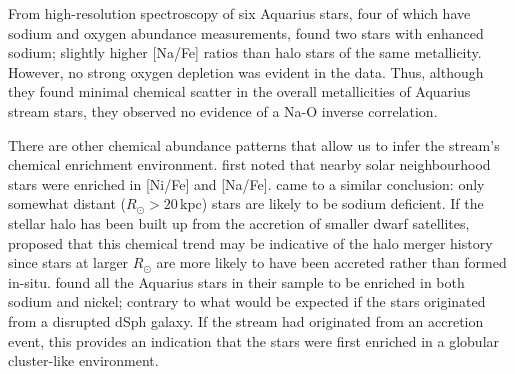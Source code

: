 \documentclass{emulateapj}
\begin{document}

From high-resolution spectroscopy of six Aquarius stars, four of which have sodium and oxygen abundance measurements, \citet{wylie-de-boer;et-al_2012} found two stars with enhanced sodium; slightly higher [Na/Fe] ratios than halo stars of the same metallicity. However, no strong oxygen depletion was evident in the data. Thus, although they found minimal chemical scatter in the overall metallicities of Aquarius stream stars, they observed no evidence of a {Na-O} inverse correlation.

There are other chemical abundance patterns that allow us to infer the stream's chemical enrichment environment. \citet{nissen;schuster_1997} first noted that nearby solar neighbourhood stars were enriched in [Ni/Fe] and [Na/Fe]. \citet{fulbright_2000} came to a similar conclusion: only somewhat distant ($R_\odot > 20$\,kpc) stars are likely to be sodium deficient. If the stellar halo has been built up from the accretion of smaller dwarf satellites, \citet{nissen;schuster_1997} proposed that this chemical trend may be indicative of the halo merger history since stars at larger $R_\odot$ are more likely to have been accreted rather than formed in-situ. \citet{wylie-de-boer;et-al_2012} found all the Aquarius stars in their sample to be enriched in both sodium and nickel; contrary to what would be expected if the stars originated from a disrupted dSph galaxy. If the stream had originated from an accretion event, this provides an indication that the stars were first enriched in a globular cluster-like environment.
\end{document}
